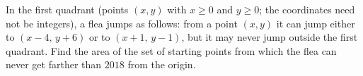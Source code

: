 In the first quadrant (points $(x,y)$ with $x\ge0$ and $y\ge0$; the coordinates need not be integers), a flea jumps as follows: from a point $(x,y)$ it can jump either to $(x-4,\,y+6)$ or to $(x+1,\,y-1)$, but it may never jump outside the first quadrant. Find the area of the set of starting points from which the flea can never get farther than $2018$ from the origin.
